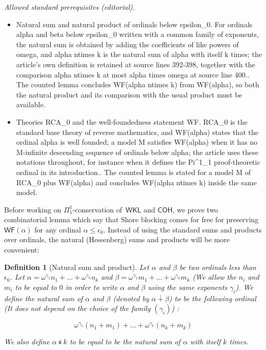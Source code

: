 \documentclass{article}
\numberwithin{theorem}{section}
\newtheorem{definition}[theorem]{Definition}
\newcommand{\WKL}{\mathsf{WKL}}
\newcommand{\COH}{\mathsf{COH}}
\newcommand{\WF}{\mathsf{WF}}
\newcommand{\nplus}{\dotplus}
\newcommand{\ntimes}{\dottimes}
\begin{document}
\noindent\textit{Allowed standard prerequisites (editorial).}\begin{itemize}
\item Natural sum and natural product of ordinals below epsilon\_0. For ordinals alpha and beta below epsilon\_0 written with a common family of exponents, the natural sum is obtained by adding the coefficients of like powers of omega, and alpha ntimes k is the natural sum of alpha with itself k times; the article's own definition is retained at source lines 392-398, together with the comparison alpha ntimes k at most alpha times omega at source line 400.. The counted lemma concludes WF(alpha ntimes k) from WF(alpha), so both the natural product and its comparison with the usual product must be available.
\item Theories RCA\_0 and the well-foundedness statement WF. RCA\_0 is the standard base theory of reverse mathematics, and WF(alpha) states that the ordinal alpha is well founded; a model M satisfies WF(alpha) when it has no M-infinite descending sequence of ordinals below alpha; the article uses these notations throughout, for instance when it defines the Pi\textasciicircum{}1\_1 proof-theoretic ordinal in its introduction.. The counted lemma is stated for a model M of RCA\_0 plus WF(alpha) and concludes WF(alpha ntimes k) inside the same model.
\end{itemize}\medskip
Before working on $\Pi^1_1$-conservation of~$\WKL$ and $\COH$, we prove two combinatorial lemma which say that Shore blocking comes for free for preserving $\WF(\alpha)$ for any ordinal $\alpha \leq \epsilon_0$. Instead of using the standard sums and products over ordinals, the natural (Hessenberg) sums and products will be more convenient:

\begin{definition}[Natural sum and product]
Let $\alpha$ and $\beta$ be two ordinals less than $\epsilon_0$. Let $\alpha = \omega^{\gamma_1}n_1 + \dots + \omega^{\gamma_k}n_k$ and $\beta = \omega^{\gamma_1}m_1 + \dots + \omega^{\gamma_k}m_k$ (We allow the $n_i$ and $m_i$ to be equal to $0$ in order to write $\alpha$ and $\beta$ using the same exponents $\gamma_i$). We define the natural sum of $\alpha$ and $\beta$ (denoted by $\alpha \nplus \beta$) to be the following ordinal (It does not depend on the choice of the family $(\gamma_i)$) : 

$$\omega^{\gamma_1}(n_1 + m_1) + \dots + \omega^{\gamma_k}(n_k + m_k)$$

We also define $\alpha \ntimes k$ to be equal to be the natural sum of $\alpha$ with itself $k$ times. %
\end{definition}
\end{document}
